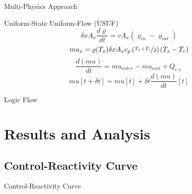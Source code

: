 \documentclass[aspectratio=169,pdftex,dvipsnames]{beamer}
\begin{document}
\begin{frame}{Multi-Physics Approach}
\begin{block}{Uniform-State Uniform-Flow (USUF)}
{            \begin{equation*}
                \delta x A_x \frac{d\varrho}{dt} = v A_x(\varrho_{in}-\varrho_{out})
            \end{equation*}
            \begin{equation*}\label{eq:T2mu}
                mu_x = \varrho(T_x)\delta x A_x c_p\left(\nicefrac{T_x+T_r}{2}\right)(T_x-T_r) 
            \end{equation*}
            \begin{equation*}
                \frac{d(mu)}{dt} = mu_{enter} - mu_{exit} + Q_{c.v.}
            \end{equation*}
            \begin{equation*}
                mu[t+\delta t] = mu[t] + \delta t\frac{d(mu)}{dt}[t]
            \end{equation*}
        }
    \end{block}
\end{frame}

\begin{frame}{Logic Flow}
    \begin{figure}[!ht]
        \centering
        \resizebox{!}{\textheight}{}
    \end{figure}
\end{frame}

\section{Results and Analysis}
\subsection{Control-Reactivity Curve}
\begin{frame}{Control-Reactivity Curve}
    \begin{figure}[!ht]
        \centering
    \end{figure}
\end{frame}
\end{document}
